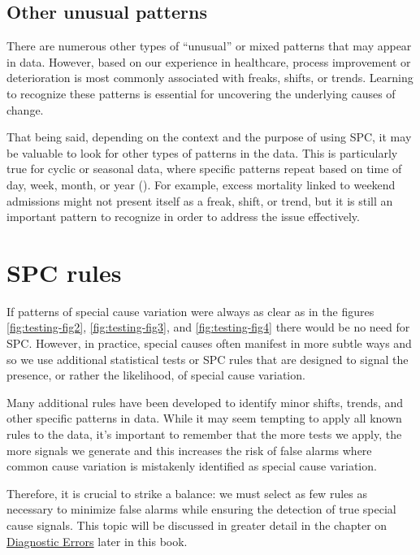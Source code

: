 \documentclass[
]{book}
\begin{document}
\subsection{Other unusual patterns}\label{other-unusual-patterns}

There are numerous other types of ``unusual'' or mixed patterns that may appear in data. However, based on our experience in healthcare, process improvement or deterioration is most commonly associated with freaks, shifts, or trends. Learning to recognize these patterns is essential for uncovering the underlying causes of change.

That being said, depending on the context and the purpose of using SPC, it may be valuable to look for other types of patterns in the data. This is particularly true for cyclic or seasonal data, where specific patterns repeat based on time of day, week, month, or year (). For example, excess mortality linked to weekend admissions might not present itself as a freak, shift, or trend, but it is still an important pattern to recognize in order to address the issue effectively.

\section{SPC rules}\label{spc-rules}

If patterns of special cause variation were always as clear as in the figures \ref{fig:testing-fig2}, \ref{fig:testing-fig3}, and \ref{fig:testing-fig4} there would be no need for SPC. However, in practice, special causes often manifest in more subtle ways and so we use additional statistical tests or SPC rules that are designed to signal the presence, or rather the likelihood, of special cause variation.

Many additional rules have been developed to identify minor shifts, trends, and other specific patterns in data. While it may seem tempting to apply all known rules to the data, it's important to remember that the more tests we apply, the more signals we generate and this increases the risk of false alarms where common cause variation is mistakenly identified as special cause variation.

Therefore, it is crucial to strike a balance: we must select as few rules as necessary to minimize false alarms while ensuring the detection of true special cause signals. This topic will be discussed in greater detail in the chapter on \hyperref[diagnostics]{Diagnostic Errors} later in this book.
\end{document}
